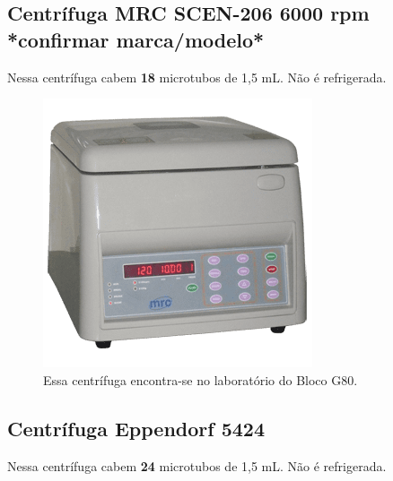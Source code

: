 \documentclass[
  letterpaper,
  DIV=11,
  numbers=noendperiod]{scrreprt}
\begin{document}
\hypertarget{centruxedfuga-mrc-scen-206-6000-rpm-confirmar-marcamodelo}{%
\subsection{Centrífuga MRC SCEN-206 6000 rpm *confirmar
marca/modelo*}\label{centruxedfuga-mrc-scen-206-6000-rpm-confirmar-marcamodelo}}

Nessa centrífuga cabem \textbf{18} microtubos de 1,5 mL. Não é
refrigerada.

\begin{figure}

{\centering \includegraphics[width=\textwidth,height=3.125in]{figures/equipamentos/Centrifuga_MRC_SCEN-206.png}

}

\caption{Essa centrífuga encontra-se no laboratório do Bloco G80.}

\end{figure}

\hypertarget{centruxedfuga-eppendorf-5424}{%
\subsection{Centrífuga Eppendorf
5424}\label{centruxedfuga-eppendorf-5424}}

Nessa centrífuga cabem \textbf{24} microtubos de 1,5 mL. Não é
refrigerada.
\end{document}
